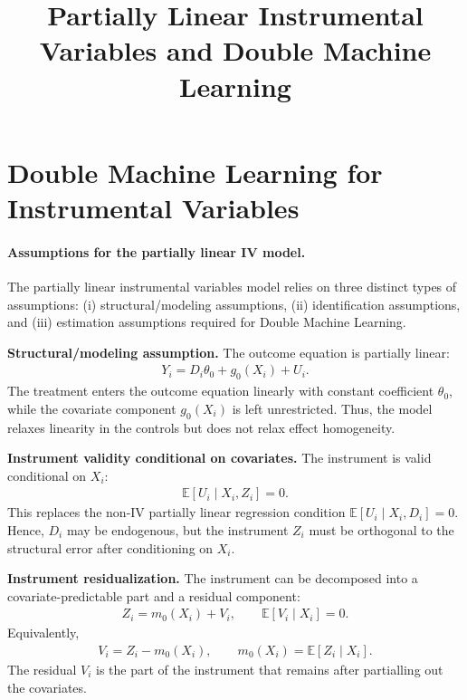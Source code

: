 \documentclass[12pt,a4paper]{article}
\title{Partially Linear Instrumental Variables and Double Machine Learning}
\author{}
\date{}
\begin{document}
\maketitle

\section{Double Machine Learning for Instrumental Variables}

\paragraph{Assumptions for the partially linear IV model.}
The partially linear instrumental variables model relies on three distinct types of assumptions:
(i) structural/modeling assumptions, (ii) identification assumptions, and (iii) estimation
assumptions required for Double Machine Learning.

\medskip
\noindent
\textbf{Structural/modeling assumption.}
The outcome equation is partially linear:
\begin{align}
    Y_i = D_i\theta_0 + g_0(X_i) + U_i.
    \label{eq:pliv_structural_assumption}
\end{align}
The treatment enters the outcome equation linearly with constant coefficient \(\theta_0\),
while the covariate component \(g_0(X_i)\) is left unrestricted. Thus, the model relaxes
linearity in the controls but does not relax effect homogeneity.

\medskip
\noindent
\textbf{Instrument validity conditional on covariates.}
The instrument is valid conditional on \(X_i\):
\begin{align}
    \mathbb{E}[U_i \mid X_i,Z_i] = 0.
    \label{eq:pliv_conditional_exogeneity}
\end{align}
This replaces the non-IV partially linear regression condition
\(\mathbb{E}[U_i \mid X_i,D_i]=0\). Hence, \(D_i\) may be endogenous, but the instrument
\(Z_i\) must be orthogonal to the structural error after conditioning on \(X_i\).

\medskip
\noindent
\textbf{Instrument residualization.}
The instrument can be decomposed into a covariate-predictable part and a residual component:
\begin{align}
    Z_i = m_0(X_i) + V_i,
    \qquad
    \mathbb{E}[V_i \mid X_i] = 0.
    \label{eq:pliv_instrument_residualization}
\end{align}
Equivalently,
\begin{align}
    V_i = Z_i - m_0(X_i),
    \qquad
    m_0(X_i)=\mathbb{E}[Z_i\mid X_i].
\end{align}
The residual \(V_i\) is the part of the instrument that remains after partialling out the
covariates.
\end{document}
